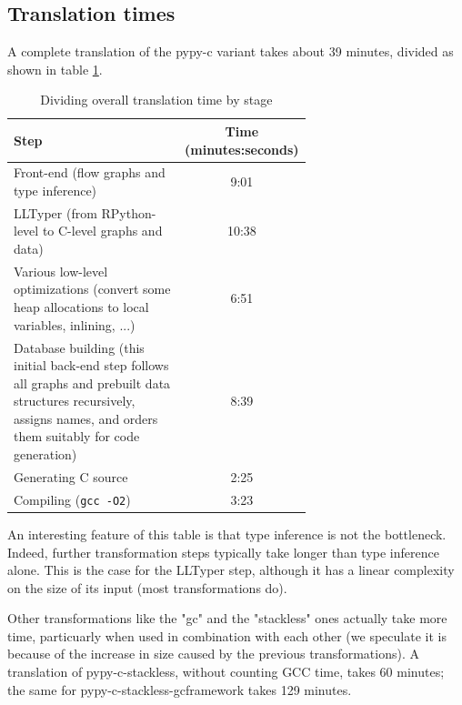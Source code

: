 \documentclass{acm_proc_article-sp}
\begin{document}
\subsection{Translation times}

A complete translation of the pypy-c variant takes about 39 minutes,
divided as shown in table \ref{translationtimes}.

\begin{table}
\centering
\caption{Dividing overall translation time by stage}
\label{translationtimes}
\begin{tabular}{|p{0.65\linewidth}|c|} \hline
\textbf{Step} & \textbf{Time (minutes:seconds)} \\ \hline
Front-end                                 
(flow graphs and type inference)          
& 9:01 \\ \hline
LLTyper                                   
(from RPython-level to C-level graphs     
and data)                                 
& 10:38 \\ \hline
Various low-level optimizations           
(convert some heap allocations to local   
variables, inlining, ...)                 
& 6:51 \\ \hline
Database building                         
(this initial back-end step follows all   
graphs and prebuilt data structures       
recursively, assigns names, and orders    
them suitably for code generation)        
& 8:39 \\ \hline
Generating C source                       
& 2:25 \\ \hline
Compiling (\texttt{gcc -O2})              
& 3:23 \\ \hline
\end{tabular}
\end{table}

An interesting feature of this table is that type inference is not the
bottleneck.  Indeed, further transformation steps typically take longer
than type inference alone.  This is the case for the LLTyper step,
although it has a linear complexity on the size of its input (most
transformations do).

Other transformations like the "gc" and the "stackless" ones actually
take more time, particuarly when used in combination with each other (we
speculate it is because of the increase in size caused by the previous
transformations).  A translation of pypy-c-stackless, without counting
GCC time, takes 60 minutes; the same for pypy-c-stackless-gcframework
takes 129 minutes.
\end{document}
